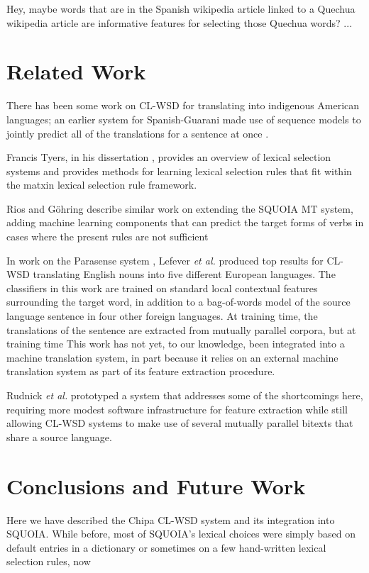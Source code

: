 \documentclass[10pt, a4paper]{article}
\begin{document}
Hey, maybe words that are in the Spanish wikipedia article linked to a Quechua
wikipedia article are informative features for selecting those Quechua words?
...

\section{Related Work}

There has been some work on CL-WSD for translating into indigenous American
languages; an earlier system for Spanish-Guarani made use of sequence models to
jointly predict all of the translations for a sentence at once
\cite{rudnick-gasser:2013:HyTra}.

Francis Tyers, in his dissertation \cite{tyers-dissertation}, provides an
overview of lexical selection systems and provides methods for learning lexical
selection rules that fit within the %
matxin lexical selection rule framework.

Rios and G\"{o}hring  describe
similar work on extending the SQUOIA MT system, adding machine learning
components that can predict the target forms of verbs in cases where the
present rules are not sufficient 

In work on the Parasense system \cite{lefever-hoste-decock:2011:ACL-HLT2011},
Lefever \emph{et al.} produced top results for CL-WSD translating English nouns
into five different European languages. The classifiers in this work are
trained on standard local contextual features surrounding the target word,
in addition to a bag-of-words model of the source language sentence in four
other foreign languages. At training time, the translations of the sentence are
extracted from mutually parallel corpora, %
but at training time
This work has not yet, to our knowledge, been integrated into a machine
translation system, in part because it relies on an external machine
translation system as part of its feature extraction procedure.

Rudnick \emph{et al.} 
prototyped a system that addresses some of the shortcomings here, requiring
more modest software infrastructure for feature extraction while still allowing
CL-WSD systems to make use of several mutually parallel bitexts that share a
source language.

\section{Conclusions and Future Work}
Here we have described the Chipa CL-WSD system and its integration into SQUOIA.
While before, most of SQUOIA's lexical choices were simply based on default
entries in a dictionary or sometimes on a few hand-written lexical selection
rules, now 




\end{document}
